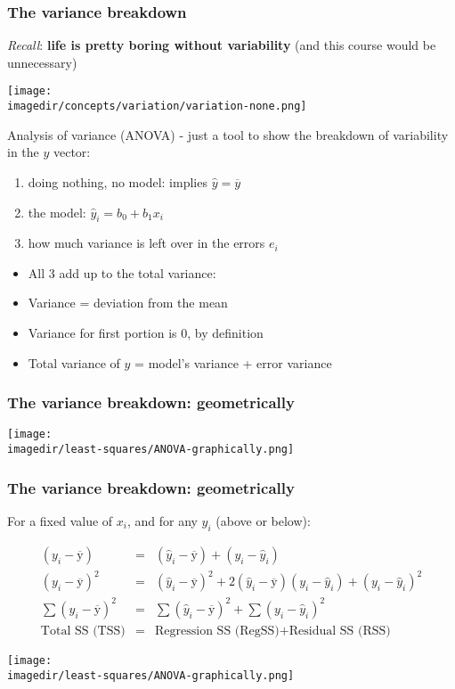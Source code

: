 \begin{frame}\frametitle{The variance breakdown}

	\emph{Recall}: \textbf{life is pretty boring without variability} (and this course would be unnecessary)
	\begin{center}
		\texttt{[image: \\imagedir/concepts/variation/variation-none.png]}
	\end{center}

	Analysis of variance (ANOVA) - just a tool to show the breakdown of variability in the $y$ vector:
	\begin{enumerate}
		\item	doing nothing, no model: implies $\hat{y} = \overline{y}$
		\item	the model: $\hat{y}_i = b_0 + b_1 x_i$
		\item	how much variance is left over in the errors $e_i$
	\end{enumerate}
	\begin{itemize}
		\item	All 3 add up to the total variance:
		\item	Variance = deviation from the mean
		\item	Variance for first portion is 0, by definition
		\item	Total variance of $y$ = model's variance + error variance
	\end{itemize}
\end{frame}

\begin{frame}\frametitle{The variance breakdown: geometrically}
	\begin{center}
		\texttt{[image: \\imagedir/least-squares/ANOVA-graphically.png]}
	\end{center}
\end{frame}

\begin{frame}\frametitle{The variance breakdown: geometrically}

	For a fixed value of $x_i$, and for any $y_i$ (above or below):

	$$
	\begin{array}{rcl}
		(y_i - \overline{\mathrm{y}}) &=& (\hat{y}_i - \overline{\mathrm{y}}) + (y_i - \hat{y}_i) \\
		(y_i - \overline{\mathrm{y}})^2 &=& (\hat{y}_i - \overline{\mathrm{y}})^2 + 2(\hat{y}_i - \overline{\mathrm{y}})(y_i - \hat{y}_i) + (y_i - \hat{y}_i)^2 \\
		\sum{(y_i - \overline{\mathrm{y}})^2} &=& \sum{(\hat{y}_i - \overline{\mathrm{y}})^2} + \sum{(y_i - \hat{y}_i)^2} \\
		\text{Total SS (TSS)} &=& \text{Regression SS (RegSS)} + \text{Residual SS (RSS)}
	\end{array}
	$$
	\begin{center}
		\texttt{[image: \\imagedir/least-squares/ANOVA-graphically.png]}
	\end{center}
\end{frame}

